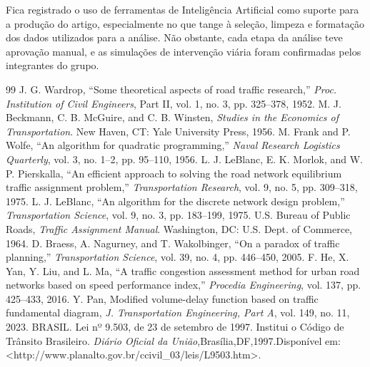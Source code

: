 \documentclass[portuguese]{sbc2025}%
\begin{document}
\begin{declarations}
\begin{furtherinformation}
Fica registrado o uso de ferramentas de Inteligência Artificial como suporte para a produção do artigo, especialmente no que tange à seleção, limpeza e formatação dos dados utilizados para a análise. Não obstante, cada etapa da análise teve aprovação manual, e as simulações de intervenção viária foram confirmadas pelos integrantes do grupo.

\end{furtherinformation}

\end{declarations}


\begin{thebibliography}{99}
 J. G. Wardrop, ``Some theoretical aspects of road traffic research,'' \textit{Proc. Institution of Civil Engineers}, Part II, vol. 1, no. 3, pp. 325--378, 1952.
 M. J. Beckmann, C. B. McGuire, and C. B. Winsten, \textit{Studies in the Economics of Transportation}. New Haven, CT: Yale University Press, 1956.
 M. Frank and P. Wolfe, ``An algorithm for quadratic programming,'' \textit{Naval Research Logistics Quarterly}, vol. 3, no. 1--2, pp. 95--110, 1956.
 L. J. LeBlanc, E. K. Morlok, and W. P. Pierskalla, ``An efficient approach to solving the road network equilibrium traffic assignment problem,'' \textit{Transportation Research}, vol. 9, no. 5, pp. 309--318, 1975.
 L. J. LeBlanc, ``An algorithm for the discrete network design problem,'' \textit{Transportation Science}, vol. 9, no. 3, pp. 183--199, 1975.
 U.S. Bureau of Public Roads, \textit{Traffic Assignment Manual}. Washington, DC: U.S. Dept. of Commerce, 1964.
 D. Braess, A. Nagurney, and T. Wakolbinger, ``On a paradox of traffic planning,'' \textit{Transportation Science}, vol. 39, no. 4, pp. 446--450, 2005.
 F. He, X. Yan, Y. Liu, and L. Ma, ``A traffic congestion assessment method for urban road networks based on speed performance index,'' \textit{Procedia Engineering}, vol. 137, pp. 425--433, 2016.
 {Y. Pan, Modified volume-delay function based on traffic fundamental diagram}, \textit{J. Transportation Engineering, Part A}, vol. 149, no. 11, 2023.
 BRASIL. Lei nº 9.503, de 23 de setembro de 1997. Institui o Código de Trânsito Brasileiro. \textit{Diário Oficial da União},Brasília,DF,1997.Disponível em: <http://www.planalto.gov.br/ccivil\_03/leis/L9503.htm>.
\end{thebibliography}
\end{document}
